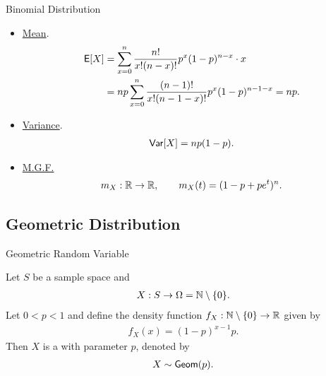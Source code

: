 \begin{frame}{Binomial Distribution}

\justifying
{} 
\begin{itemize}
	\justifying
	\item \underline{Mean}.
	\begin{align*}
	\mathsf{E}[X] & = \sum_{x=0}^n \frac{n!}{x!(n-x)!}p^x(1-p)^{n-x} \cdot x \\
	& = np\sum_{x=0}^n \frac{(n-1)!}{x!(n-1-x)!}p^x(1-p)^{n-1-x} = np.
	\end{align*}
	\item \underline{Variance}. 
	\begin{align*}
	\mathsf{Var}[X] = np(1-p).
	\end{align*}
	\item \underline{M.G.F.}
	\begin{align*}
	m_X: \mathbb{R}\rightarrow\mathbb{R}, \qquad m_X(t) = (1 - p + pe^t)^n.
	\end{align*}
\end{itemize}

\end{frame}

\subsection{Geometric Distribution}

\begin{frame}{Geometric Random Variable}

\justifying
{} Let $S$ be a sample space and
\begin{align*}
X: S\rightarrow \Omega = \mathbb{N}\setminus \{0\}.
\end{align*}
Let $0 < p < 1$ and define the density function $f_X: \mathbb{N}\setminus \{0\} \rightarrow \mathbb{R}$ given by
\begin{align*}
f_X(x) = (1-p)^{x-1} p.
\end{align*}
Then $X$ is a  with parameter $p$, denoted by
\begin{align*}
X\sim \mathsf{Geom}(p).
\end{align*}

\end{frame}


